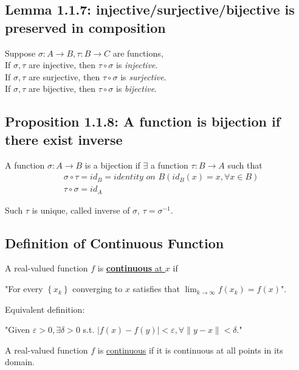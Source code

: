 \documentclass[11pt]{elegantbook}
\begin{document}
\subsection{Lemma 1.1.7: injective/surjective/bijective is preserved in composition}
\begin{lemma}[Lemma 1.1.7]
    Suppose $\sigma:A \rightarrow B, \tau: B \rightarrow C$ are functions,\\
    If $\sigma, \tau$ are injective, then $\tau\circ\sigma$ is \textit{injective}.\\
    If $\sigma, \tau$ are surjective, then $\tau\circ\sigma$ is \textit{surjective}.\\
    If $\sigma, \tau$ are bijective, then $\tau\circ\sigma$ is \textit{bijective}.
\end{lemma}

\subsection{Proposition 1.1.8: A function is bijection if there exist inverse}
\begin{proposition}[Proposition 1.1.8]
    A function $\sigma:A \rightarrow B$ is a bijection if $\exists$ a function $\tau:B \rightarrow A $ such that
    \begin{equation}
        \begin{aligned}
            &\sigma\circ\tau=id_B=\textit{identity on }B(id_B(x)=x, \forall x\in B)\\
            &\tau\circ\sigma=id_A
        \end{aligned}
        \nonumber
    \end{equation}
\end{proposition}
Such $\tau$ is unique, called inverse of $\sigma$, $\tau=\sigma^{-1}$.

\subsection{Definition of Continuous Function}
\begin{definition}
    \normalfont
    A real-valued function $f$ is \underline{\textbf{continuous} at $x$} if
    
    "For every $\left\{x_{k}\right\}$ converging to $x$ satisfies that $\lim _{k \rightarrow \infty} f\left(x_{k}\right)=f(x)$".

    Equivalent definition:
    
    "Given $\varepsilon>0, \exists \delta>0$ s.t.
    $|f(x)-f(y)|<\varepsilon, \forall\|y-x\|<\delta$."
\end{definition}
\begin{definition}
    \normalfont
    A real-valued function $f$ is \underline{continuous} if it is continuous at all points in its domain.
\end{definition}
\end{document}

